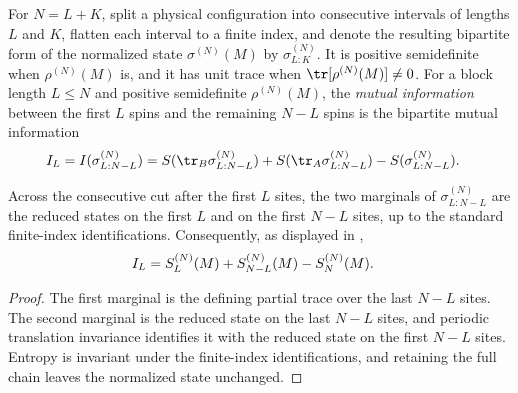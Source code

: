 \begin{definition}\label{def:mutual_info_chain}
    \leanok
    For $N=L+K$, split a physical configuration into consecutive intervals of
    lengths $L$ and $K$, flatten each interval to a finite index, and denote the
    resulting bipartite form of the normalized state $\sigma^{(N)}(M)$ by
    $\sigma^{(N)}_{L:K}$. It is positive semidefinite when $\rho^{(N)}(M)$ is,
    and it has unit trace when $\tr[\rho^{(N)}(M)]\neq0$. For a block length
    $L\le N$ and positive semidefinite $\rho^{(N)}(M)$, the
    \emph{mutual information} between the first $L$ spins and the remaining
    $N-L$ spins is the bipartite mutual information
    \begin{align}
        I_L & =I(\sigma^{(N)}_{L:N-L})
        =S(\tr_B\sigma^{(N)}_{L:N-L})+S(\tr_A\sigma^{(N)}_{L:N-L})
        -S(\sigma^{(N)}_{L:N-L}).
        \notag
    \end{align}
\end{definition}

\begin{lemma}
    \label{lem:mutual_info_chain_block_entropies}
    \leanok
    Across the consecutive cut after the first $L$ sites, the two marginals
    of $\sigma^{(N)}_{L:N-L}$ are the reduced states on the first $L$ and on
    the first $N-L$ sites, up to the standard finite-index identifications.
    Consequently, as displayed in \cite[line~797]{Cirac2016MPDO_arXiv},
    \begin{align}
        I_L & =S_L^{(N)}(M)+S_{N-L}^{(N)}(M)-S_N^{(N)}(M).
        \notag
    \end{align}
\end{lemma}

\begin{proof}\leanok
    The first marginal is the defining partial trace over the last $N-L$
    sites. The second marginal is the reduced state on the last $N-L$ sites,
    and periodic translation invariance identifies it with the reduced state on
    the first $N-L$ sites. Entropy is invariant under the finite-index
    identifications, and retaining the full chain leaves the normalized state
    unchanged.
\end{proof}

